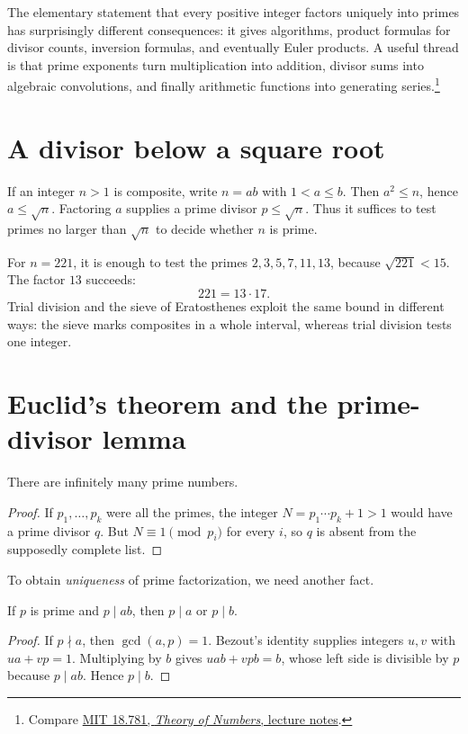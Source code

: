 
The elementary statement that every positive integer factors uniquely into primes has surprisingly different consequences: it gives algorithms, product formulas for divisor counts, inversion formulas, and eventually Euler products. A useful thread is that prime exponents turn multiplication into addition, divisor sums into algebraic convolutions, and finally arithmetic functions into generating series.\footnote{Compare \href{https://ocw.mit.edu/courses/18-781-theory-of-numbers-spring-2012/pages/lecture-notes/}{MIT 18.781, \emph{Theory of Numbers}, lecture notes}.}

\section{A divisor below a square root}

If an integer \(n>1\) is composite, write \(n=ab\) with \(1<a\le b\). Then \(a^2\le n\), hence \(a\le\sqrt n\). Factoring \(a\) supplies a prime divisor \(p\le\sqrt n\). Thus it suffices to test primes no larger than \(\sqrt n\) to decide whether \(n\) is prime.

For \(n=221\), it is enough to test the primes \(2,3,5,7,11,13\), because \(\sqrt{221}<15\). The factor \(13\) succeeds:
\[
 221=13\cdot17.
\]
Trial division and the sieve of Eratosthenes exploit the same bound in different ways: the sieve marks composites in a whole interval, whereas trial division tests one integer.

\section{Euclid's theorem and the prime-divisor lemma}

\begin{theorem}[Euclid]
There are infinitely many prime numbers.
\end{theorem}
\begin{proof}
If \(p_1,\ldots,p_k\) were all the primes, the integer \(N=p_1\cdots p_k+1>1\) would have a prime divisor \(q\). But \(N\equiv1\pmod{p_i}\) for every \(i\), so \(q\) is absent from the supposedly complete list.
\end{proof}

To obtain \emph{uniqueness} of prime factorization, we need another fact.

\begin{lemma}
If \(p\) is prime and \(p\mid ab\), then \(p\mid a\) or \(p\mid b\).
\end{lemma}
\begin{proof}
If \(p\nmid a\), then \(\gcd(a,p)=1\). Bezout's identity supplies integers \(u,v\) with \(ua+vp=1\). Multiplying by \(b\) gives \(uab+vpb=b\), whose left side is divisible by \(p\) because \(p\mid ab\). Hence \(p\mid b\).
\end{proof}

